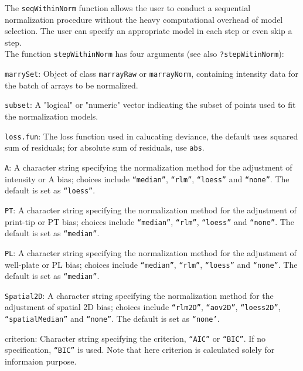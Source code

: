 \documentclass[11pt]{article}
\newcommand{\code}[1]{{\tt #1}}
\newcommand{\Rfunc}[1]{{\tt #1}}
\begin{document}
The \Rfunc{seqWithinNorm} function allows the user to conduct a sequential 
normalization procedure without the heavy computational overhead of model
selection. The user can specify an appropriate model in each step or 
even skip a step. \\

The function \Rfunc{stepWithinNorm} has four arguments (see also \code{?stepWitinNorm}): 
\begin{description}
  \item
    {\code{marrySet}:} Object of class \code{marrayRaw} or \code{marrayNorm}, containing intensity 
    data for the batch of arrays to be normalized. 
  \item
    {\code{subset}:} A "logical" or "numeric" vector indicating the subset of points used to 
    fit the  normalization models.
  \item
    {\code{loss.fun}:} The loss function used in calucating deviance, the default uses squared 
    sum of residuals; for absolute sum of residuals, use \code{abs}.
  \item
    {\code{A}:}  A character string specifying the normalization method for the adjustment 
    of intensity or A bias; choices include \code{``median''}, \code{``rlm''}, \code{``loess''}
    and \code{``none''}. The default is set as \code{``loess''}.
  \item
    {\code{PT}:} A character string specifying the normalization method for the adjustment 
    of print-tip or PT bias; choices include \code{``median''}, \code{``rlm''}, \code{``loess''}
    and \code{``none''}. The default is set as \code{``median''}.
  \item
    {\code{PL}:} A character string specifying the normalization method for the adjustment 
    of well-plate or PL bias; choices include \code{``median''}, \code{``rlm''}, \code{``loess''}
    and \code{``none''}. The default is set as \code{``median''}.
  \item
    {\code{Spatial2D}:} A character string specifying the normalization method for the adjustment 
    of spatial 2D bias;  choices include \code{``rlm2D''}, \code{``aov2D''}, \code{``loess2D''},
    \code{``spatialMedian''} and \code{``none''}. The default is set as \code{``none'}. 
  \item
    {{criterion}:} Character string specifying the criterion, \code{``AIC''} or \code{``BIC''}.
    If no specification, \code{``BIC''} is used. Note that here criterion is calculated solely for 
    informaion purpose.
\end{description}
\end{document}
